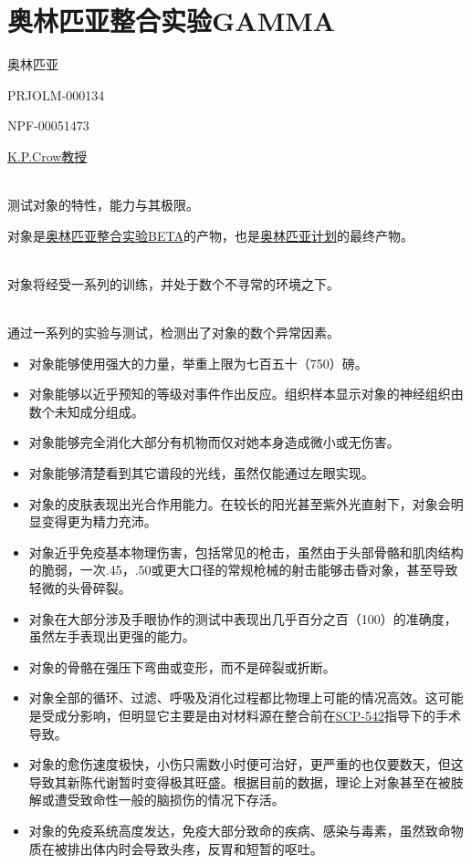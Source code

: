 \chapter{奥林匹亚整合实验GAMMA}

\label{chap:TALE-olympia-integration-experiment-gamma}

奥林匹亚

PRJOLM-000134

NPF-00051473

\hyperref[chap:AUTHOR-kain-pathos-crow]{K.P.Crow教授}

\\
测试对象的特性，能力与其极限。

对象是\hyperref[chap:TALE-olympia-integration-experiment-beta]{奥林匹亚整合实验BETA}的产物，也是\hyperref[chap:COMP-olympia-project]{奥林匹亚计划}的最终产物。

\\
对象将经受一系列的训练，并处于数个不寻常的环境之下。

\\
通过一系列的实验与测试，检测出了对象的数个异常因素。


\begin{itemize}
\item 对象能够使用强大的力量，举重上限为七百五十（750）磅。
\item 对象能够以近乎预知的等级对事件作出反应。组织样本显示对象的神经组织由数个未知成分组成。
\item 对象能够完全消化大部分有机物而仅对她本身造成微小或无伤害。
\item 对象能够清楚看到其它谱段的光线，虽然仅能通过左眼实现。
\item 对象的皮肤表现出光合作用能力。在较长的阳光甚至紫外光直射下，对象会明显变得更为精力充沛。
\item 对象近乎免疫基本物理伤害，包括常见的枪击，虽然由于头部骨骼和肌肉结构的脆弱，一次.45，.50或更大口径的常规枪械的射击能够击昏对象，甚至导致轻微的头骨碎裂。
\item 对象在大部分涉及手眼协作的测试中表现出几乎百分之百（100）的准确度，虽然左手表现出更强的能力。
\item 对象的骨骼在强压下弯曲或变形，而不是碎裂或折断。
\item 对象全部的循环、过滤、呼吸及消化过程都比物理上可能的情况高效。这可能是受成分影响，但明显它主要是由对材料源在整合前在\hyperref[chap:SCP-542]{SCP-542}指导下的手术导致。
\item 对象的愈伤速度极快，小伤只需数小时便可治好，更严重的也仅要数天，但这导致其新陈代谢暂时变得极其旺盛。根据目前的数据，理论上对象甚至在被肢解或遭受致命性一般的脑损伤的情况下存活。
\item 对象的免疫系统高度发达，免疫大部分致命的疾病、感染与毒素，虽然致命物质在被排出体内时会导致头疼，反胃和短暂的呕吐。
\end{itemize}

